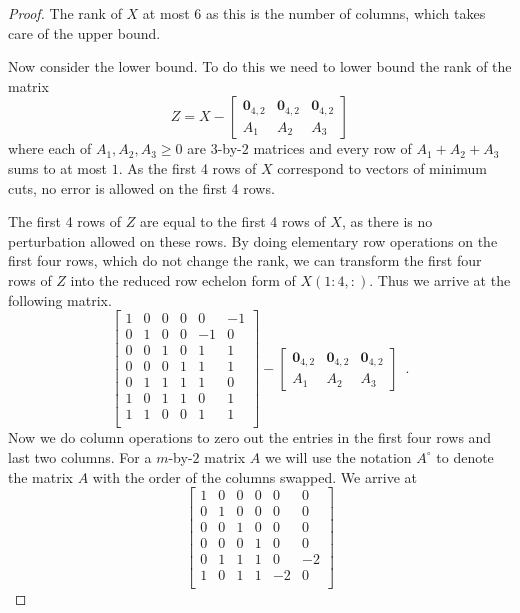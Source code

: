 \documentclass[10pt,a4paper]{article}
\newcommand{\zero}{\mathbf{0}}
\newcommand{\1}{\mathbf{1}}
\theoremstyle{definition}
\begin{document}
\begin{proof}
The rank of $X$ at most $6$ as this is the number of columns, which takes care of the upper bound.

Now consider the lower bound.  To do this we need to lower bound the rank of the matrix
\[
Z=
X -
\begin{bmatrix}
\zero_{4,2} & \zero_{4,2} & \zero_{4,2} \\
A_1 & A_2 & A_3
\end{bmatrix}
\]
where each of $A_1, A_2,A_3 \ge 0$ are $3$-by-$2$ matrices and every row of $A_1 + A_2 + A_3$ sums to at most $1$.
As the first 4 rows of $X$ correspond to vectors of minimum cuts, no error is allowed on the first 4 rows.

The first 4 rows of $Z$ are equal to the first 4 rows of $X$, as there is no perturbation allowed on these rows.  By doing
elementary row operations on the first four rows, which do not change the rank, we can transform the first four rows of $Z$ into the reduced row echelon form
of $X(1:4, :)$.  Thus we arrive at the following matrix.
\[
\begin{bmatrix}
1 &  0 &  0 &  0 &  0 & -1 \\
0 &  1 &  0 &  0 & -1 &  0 \\
0 &  0 &  1 &  0 &  1 &  1 \\
0 &  0 &  0 &  1 &  1 &  1 \\
0 &  1 &  1 &  1 &  1 &  0 \\
1 &  0 &  1 &  1 &  0 &  1 \\
1 &  1 &  0 &  0 &  1 &  1 \\
\end{bmatrix}
-
\begin{bmatrix}
\zero_{4,2} & \zero_{4,2} & \zero_{4,2} \\
A_1 & A_2 & A_3
\end{bmatrix}
\enspace .
\]
Now we do column operations to zero out the entries in the first four rows and last two columns.  For a $m$-by-$2$ matrix $A$
we will use the notation $A^\circ$ to denote the matrix $A$ with the order of the columns swapped.
We arrive at
\[
\begin{bmatrix}
1 &  0 &  0 &  0 &  0 & 0 \\
0 &  1 &  0 &  0 & 0 &  0 \\
0 &  0 &  1 &  0 &  0 &  0 \\
0 &  0 &  0 &  1 &  0 &  0 \\
0 &  1 &  1 &  1 &  0 &  -2 \\
1 &  0 &  1 &  1 &  -2 &  0 \\

\end{bmatrix}\]
\end{proof}
\end{document}
